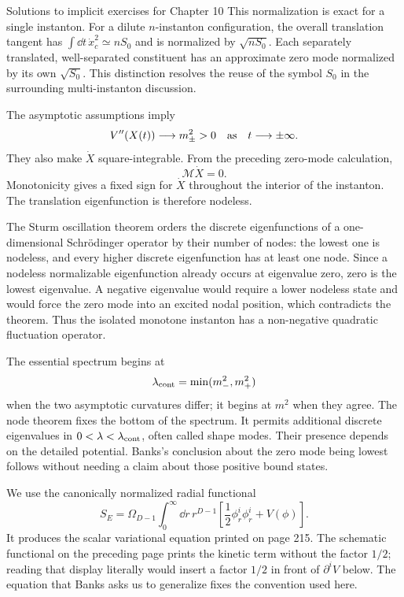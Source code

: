 \begin{bankssolutions}{Solutions to implicit exercises for Chapter 10}
This normalization is exact for a single instanton.  For a dilute
$n$-instanton configuration, the overall translation tangent has
$\int\dd t\,\dot x_c^2\simeq nS_0$ and is normalized by
$\sqrt{nS_0}$.  Each separately translated, well-separated constituent has
an approximate zero mode normalized by its own $\sqrt{S_0}$.  This distinction
resolves the reuse of the symbol $S_0$ in the surrounding multi-instanton
discussion.

The asymptotic assumptions imply
\[
  V''(X(t))\longrightarrow m_\pm^2>0
  \quad\hbox{as}\quad t\longrightarrow\pm\infty.
\]
They also make $\dot X$ square-integrable.  From the preceding zero-mode
calculation,
\[
  \mathcal M\dot X=0.
\]
Monotonicity gives a fixed sign for $\dot X$ throughout the interior of the
instanton.  The translation eigenfunction is therefore nodeless.

The Sturm oscillation theorem orders the discrete eigenfunctions of a
one-dimensional Schrödinger operator by their number of nodes: the lowest one
is nodeless, and every higher discrete eigenfunction has at least one node.
Since a nodeless normalizable eigenfunction already occurs at eigenvalue zero,
zero is the lowest eigenvalue.  A negative eigenvalue would require a lower
nodeless state and would force the zero mode into an excited nodal position,
which contradicts the theorem.  Thus the isolated monotone instanton has a
non-negative quadratic fluctuation operator.

The essential spectrum begins at
\[
  \lambda_{\rm cont}=\min(m_-^2,m_+^2)
\]
when the two asymptotic curvatures differ; it begins at $m^2$ when they agree.
The node theorem fixes the bottom of the spectrum.  It permits additional
discrete eigenvalues in $0<\lambda<\lambda_{\rm cont}$, often called shape
modes.  Their presence depends on the detailed potential.  Banks's conclusion
about the zero mode being lowest follows without needing a claim about those
positive bound states.

We use the canonically normalized radial functional
\[
  S_E=\Omega_{D-1}\int_0^\infty\dd r\,r^{D-1}
  \left[\frac12\phi_r^i\phi_r^i+V(\phi)\right].
\]
It produces the scalar variational equation printed on page 215.  The
schematic functional on the preceding page prints the kinetic term without
the factor $1/2$; reading that display literally would insert a factor
$1/2$ in front of $\partial^iV$ below.  The equation that Banks asks us to
generalize fixes the convention used here.


\end{bankssolutions}
